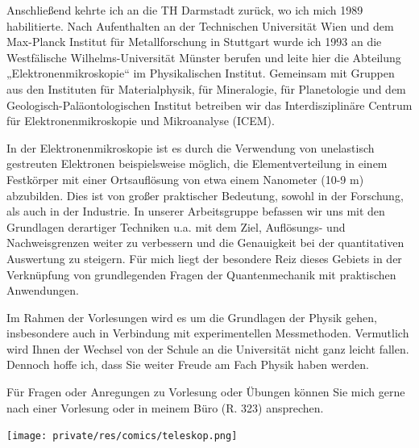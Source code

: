 \begin{multicols}{2}
Anschließend kehrte ich an die TH Darmstadt zurück, wo ich mich 1989 habilitierte. Nach Aufenthalten an der Technischen Universität Wien und dem Max-Planck Institut für Metallforschung in Stuttgart wurde ich 1993 an die Westfälische Wilhelms-Universität Münster berufen und leite hier die Abteilung „Elektronenmikroskopie“ im Physikalischen Institut.  Gemeinsam mit Gruppen aus den Instituten für Materialphysik, für Mineralogie, für Planetologie und dem Geologisch-Paläontologischen Institut betreiben wir das Interdisziplinäre Centrum für Elektronenmikroskopie und Mikroanalyse (ICEM).

In der Elektronenmikroskopie ist es durch die Verwendung von unelastisch gestreuten Elektronen beispielsweise möglich, die Elementverteilung in einem Festkörper mit einer Ortsauflösung von etwa einem Nanometer (10-9 m) abzubilden. Dies ist von großer praktischer Bedeutung, sowohl in der Forschung, als auch in der Industrie. In unserer Arbeitsgruppe befassen wir uns mit den Grundlagen derartiger Techniken u.a. mit dem Ziel, Auflösungs- und Nachweisgrenzen weiter  zu verbessern und die Genauigkeit bei der quantitativen Auswertung zu steigern. Für mich liegt der besondere Reiz dieses Gebiets in der Verknüpfung von grundlegenden Fragen der Quantenmechanik mit praktischen Anwendungen.

Im Rahmen der Vorlesungen wird es um die Grundlagen der Physik gehen, insbesondere auch in Verbindung mit experimentellen Messmethoden. Vermutlich wird Ihnen der Wechsel von der Schule an die Universität nicht ganz leicht fallen. Dennoch hoffe ich, dass Sie weiter Freude am Fach Physik haben werden.   

Für Fragen oder Anregungen zu Vorlesung oder Übungen können Sie mich gerne nach einer Vorlesung oder in meinem Büro (R. 323) ansprechen.

\begin{center}
\texttt{[image: private/res/comics/teleskop.png]}
\end{center}
\end{multicols}

\newpage

